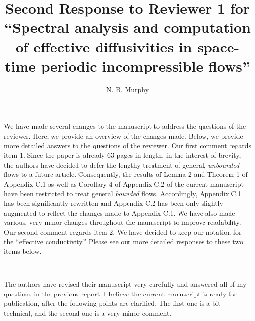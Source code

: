 \documentclass[amsa]{article}
\begin{document}
\title{Second Response to Reviewer 1 for\\
  ``Spectral analysis and computation\\
  of effective diffusivities in 
  space-time periodic incompressible flows''}
\author{N. B. Murphy}

\maketitle

We have made several changes to the manuscript to address the
questions of the reviewer. Here, we provide an overview of the changes
made. Below, we provide more detailed answers to the questions of the
reviewer. Our first comment regards item 1. Since the paper is already
63 pages in length, in the interest of brevity, the authors have
decided  to defer the lengthy treatment of general, \emph{unbounded}
flows to a future article. Consequently, the results of Lemma 2 and
Theorem 1 of Appendix C.1 as well as Corollary 4 of Appendix C.2 of
the current manuscript have been restricted to treat general
\emph{bounded} flows. Accordingly, Appendix C.1 has been significantly
rewritten and Appendix C.2 has been only slightly augmented to reflect
the changes made to Appendix C.1. We have also made various, very minor
changes throughout the manuscript to improve readability. Our second
comment regards item 2. We have decided to keep our notation for the
``effective conductivity.'' Please see our more detailed responses to
these two items below.

------------

The authors have revised their manuscript very carefully and answered
all of my questions in the previous report. I believe the current
manuscript is ready for publication, after the following points are
clarified. The first one is a bit technical, and the second one is a
very minor comment.  
\end{document}
